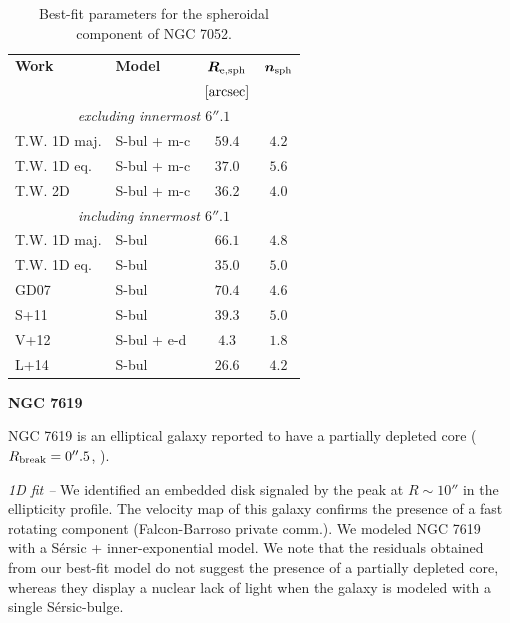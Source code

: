 \documentclass[preprint2]{emulateapj}
\begin{document}
  \begin{table}[h]
  \small
  \caption{Best-fit parameters for the spheroidal component of NGC 7052.}
  \begin{center}
  \begin{tabular}{llcc}
  \hline
  {\bf Work} & {\bf Model}   & $\bm R_{\rm e,sph}$    & $\bm n_{\rm sph}$ \\
    &  &  $[\rm arcsec]$ & \\
  \hline
  \multicolumn{4}{c}{\emph{excluding innermost $6''.1$}} \\
  T.W. 1D maj. & S-bul + m-c & $59.4$  &  $4.2$ \\
  T.W. 1D eq.  & S-bul + m-c & $37.0$  &  $5.6$ \\
  T.W. 2D      & S-bul + m-c & $36.2$  &  $4.0$ \\
  \hline
  \multicolumn{4}{c}{\emph{including innermost $6''.1$}} \\
  T.W. 1D maj. & S-bul & $66.1$  &  $4.8$ \\
  T.W. 1D eq.  & S-bul & $35.0$  &  $5.0$ \\
  \hline
  GD07      & S-bul & $70.4$  &  $4.6$ \\
  S+11      & S-bul & $39.3$  &  $5.0$ \\
  V+12      & S-bul + e-d & $4.3$  &  $1.8$ \\
  L+14      & S-bul & $26.6$  &  $4.2$ \\
  \hline
  \end{tabular}
  \end{center}
  \label{tab:n7052}
  \end{table}


  \clearpage\newpage\noindent
  {\bf NGC 7619 \\}

  NGC 7619 is an elliptical galaxy reported to have a partially depleted core ($R_{\rm break} = 0''.5$, \citealt{rusli2013}).


  \emph{1D fit -- }
  We identified an embedded disk signaled by the peak at $R \sim 10''$ in the ellipticity profile.
  The velocity map of this galaxy confirms the presence of a fast rotating component (Falcon-Barroso private comm.).
  We modeled NGC 7619 with a S\'ersic + inner-exponential model.
  We note that the residuals obtained from our best-fit model do not suggest the presence of a partially depleted core,
  whereas they display a nuclear lack of light when the galaxy is modeled with a single S\'ersic-bulge. 
\end{document}
